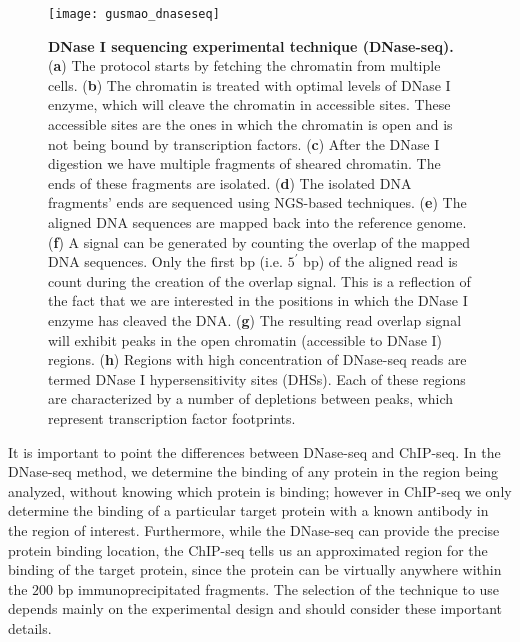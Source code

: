 \begin{figure}[h!]
\centering
\texttt{[image: gusmao\_dnaseseq]}
\caption[DNase I sequencing experimental technique (DNase-seq)]{\textbf{DNase I sequencing experimental technique (DNase-seq).} (\textbf{a}) The protocol starts by fetching the chromatin from multiple cells. (\textbf{b}) The chromatin is treated with optimal levels of DNase I enzyme, which will cleave the chromatin in accessible sites. These accessible sites are the ones in which the chromatin is open and is not being bound by transcription factors. (\textbf{c}) After the DNase I digestion we have multiple fragments of sheared chromatin. The ends of these fragments are isolated. (\textbf{d}) The isolated DNA fragments' ends are sequenced using NGS-based techniques. (\textbf{e}) The aligned DNA sequences are mapped back into the reference genome. (\textbf{f}) A signal can be generated by counting the overlap of the mapped DNA sequences. Only the first bp (i.e. $5^{\prime}$ bp) of the aligned read is count during the creation of the overlap signal. This is a reflection of the fact that we are interested in the positions in which the DNase I enzyme has cleaved the DNA. (\textbf{g}) The resulting read overlap signal will exhibit peaks in the open chromatin (accessible to DNase I) regions. (\textbf{h}) Regions with high concentration of DNase-seq reads are termed DNase I hypersensitivity sites (DHSs). Each of these regions are characterized by a number of depletions between peaks, which represent transcription factor footprints.}
\label{fig:gusmao_dnaseseq}
\end{figure}

It is important to point the differences between DNase-seq and ChIP-seq. In the DNase-seq method, we determine the binding of any protein in the region being analyzed, without knowing which protein is binding; however in ChIP-seq we only determine the binding of a particular target protein with a known antibody in the region of interest. Furthermore, while the DNase-seq can provide the precise protein binding location, the ChIP-seq tells us an approximated region for the binding of the target protein, since the protein can be virtually anywhere within the \approxy$200$ bp immunoprecipitated fragments. The selection of the technique to use depends mainly on the experimental design and should consider these important details.

